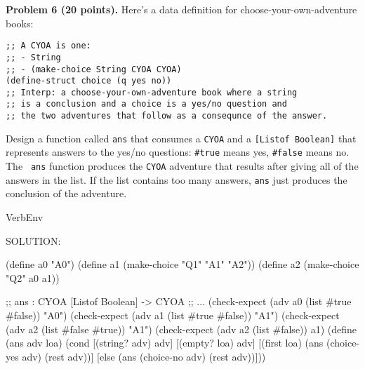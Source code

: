 \documentclass[12pt]{article}
\begin{document}
\noindent
{\bf Problem 6 (20 points).}
%
Here's a data definition for choose-your-own-adventure books:
\begin{verbatim}
;; A CYOA is one:
;; - String
;; - (make-choice String CYOA CYOA)
(define-struct choice (q yes no))
;; Interp: a choose-your-own-adventure book where a string
;; is a conclusion and a choice is a yes/no question and
;; the two adventures that follow as a consequnce of the answer.
\end{verbatim}

\noindent
Design a function called {\tt ans} that consumes a {\tt CYOA} and a
{\tt [Listof Boolean]} that represents answers to the yes/no
questions: {\tt \#true} means yes, {\tt \#false} means no.  The {\tt
  ans} function produces the {\tt CYOA} adventure that results after
giving all of the answers in the list.  If the list contains too many
answers, {\tt ans} just produces the conclusion of the adventure.


\begin{SaveVerbatim}{VerbEnv}

SOLUTION:

(define a0 "A0")
(define a1 (make-choice "Q1" "A1" "A2"))
(define a2 (make-choice "Q2" a0 a1))

;; ans : CYOA [Listof Boolean] -> CYOA
;; ...
(check-expect (adv a0 (list #true #false)) "A0")
(check-expect (adv a1 (list #true #false)) "A1")
(check-expect (adv a2 (list #false #true)) "A1")
(check-expect (adv a2 (list #false)) a1)
(define (ans adv loa)
  (cond [(string? adv) adv]
        [(empty? loa) adv]
        [(first loa)
         (ans (choice-yes adv) (rest adv))]
        [else
         (ans (choice-no adv) (rest adv))]))
\end{SaveVerbatim}

\end{document}
